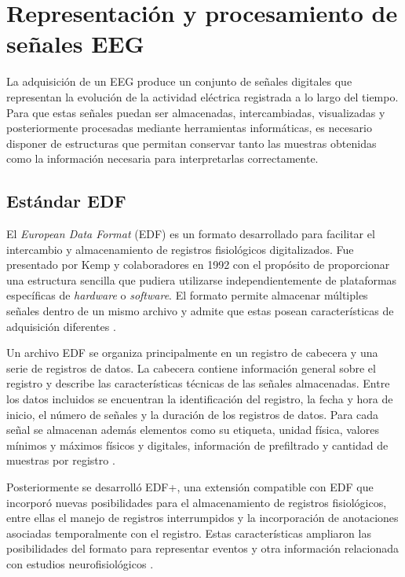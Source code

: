 \section{Representación y procesamiento de señales EEG}
\label{sec:representacion-procesamiento-eeg}

La adquisición de un EEG produce un conjunto de señales digitales que
representan la evolución de la actividad eléctrica registrada a lo largo del
tiempo. Para que estas señales puedan ser almacenadas, intercambiadas,
visualizadas y posteriormente procesadas mediante herramientas informáticas,
es necesario disponer de estructuras que permitan conservar tanto las
muestras obtenidas como la información necesaria para interpretarlas
correctamente.

\subsection{Estándar EDF}
\label{subsec:estandar-edf}

El \textit{European Data Format} (EDF) es un formato desarrollado para
facilitar el intercambio y almacenamiento de registros fisiológicos
digitalizados. Fue presentado por Kemp y colaboradores en 1992 con el
propósito de proporcionar una estructura sencilla que pudiera utilizarse
independientemente de plataformas específicas de \textit{hardware} o \textit{software}. El formato permite almacenar múltiples señales dentro de un mismo archivo y admite que estas posean características de adquisición diferentes
\citep{Kemp1992EDF}.

Un archivo EDF se organiza principalmente en un registro de cabecera y una
serie de registros de datos. La cabecera contiene información general sobre
el registro y describe las características técnicas de las señales
almacenadas. Entre los datos incluidos se encuentran la identificación del
registro, la fecha y hora de inicio, el número de señales y la duración de
los registros de datos. Para cada señal se almacenan además elementos como
su etiqueta, unidad física, valores mínimos y máximos físicos y digitales,
información de prefiltrado y cantidad de muestras por registro
\citep{Kemp1992EDF}.

Posteriormente se desarrolló EDF+, una extensión compatible con EDF que
incorporó nuevas posibilidades para el almacenamiento de registros
fisiológicos, entre ellas el manejo de registros interrumpidos y la
incorporación de anotaciones asociadas temporalmente con el registro. Estas
características ampliaron las posibilidades del formato para representar
eventos y otra información relacionada con estudios neurofisiológicos \citep{KempOlivan2003EDFPlus}.

